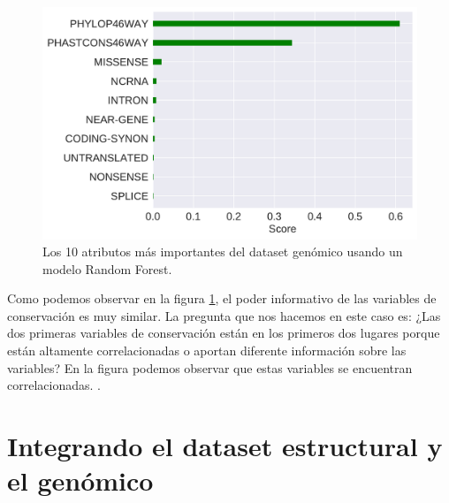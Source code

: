 \begin{figure}[H]
    \centering
    \includegraphics[scale=0.55]{documents/latex/figures/3/importances_genomic.pdf}
    \caption{Los 10 atributos más importantes del dataset genómico usando un modelo Random Forest.}
    \label{fig:importances_genomic}
\end{figure}

Como podemos observar en la figura \ref{fig:importances_genomic}, el poder informativo de las variables de conservación es muy similar. La pregunta que nos hacemos en este caso es: ¿Las dos primeras variables de conservación están en los primeros dos lugares porque están altamente correlacionadas o aportan diferente información sobre las variables? En la figura \todo{[x]} podemos observar que estas variables se encuentran correlacionadas.  . 




\newpage

\section{Integrando el dataset estructural y el genómico}


